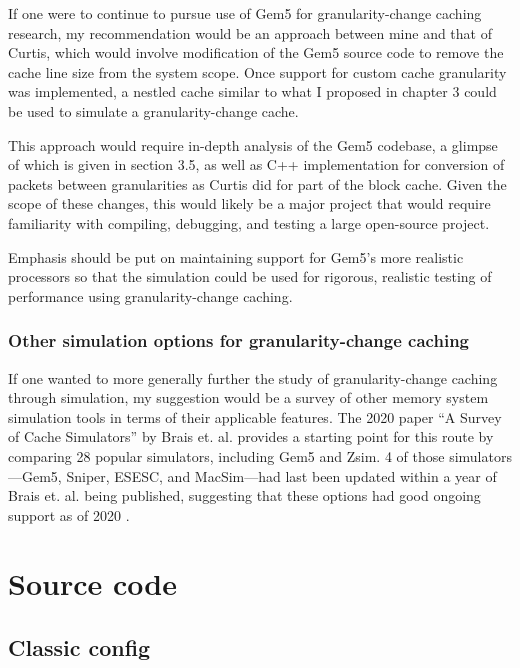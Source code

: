 \documentclass[12pt,twoside]{reedthesis}
\begin{document}
	If one were to continue to pursue use of Gem5 for granularity-change caching research, my recommendation would be an approach between mine and that of Curtis, which would involve modification of the Gem5 source code to remove the cache line size from the system scope. Once support for custom cache granularity was implemented, a nestled cache similar to what I proposed in chapter 3 could be used to simulate a granularity-change cache.
	
	This approach would require in-depth analysis of the Gem5 codebase, a glimpse of which is given in section 3.5, as well as C++ implementation for conversion of packets between granularities as Curtis did for part of the block cache. Given the scope of these changes, this would likely be a major project that would require familiarity with compiling, debugging, and testing a large open-source project.

	Emphasis should be put on maintaining support for Gem5's more realistic processors so that the simulation could be used for rigorous, realistic testing of performance using granularity-change caching.

	\subsection*{Other simulation options for granularity-change caching}

	If one wanted to more generally further the study of granularity-change caching through simulation, my suggestion would be a survey of other memory system simulation tools in terms of their applicable features. The 2020 paper ``A Survey of Cache Simulators'' by Brais et. al. provides a starting point for this route by comparing 28 popular simulators, including Gem5 and Zsim. 4 of those simulators---Gem5, Sniper, ESESC, and MacSim---had last been updated within a year of Brais et. al. being published, suggesting that these options had good ongoing support as of 2020 \cite{brais}.

	
\appendix

\chapter{Source code}

\section{Classic config}
\end{document}
